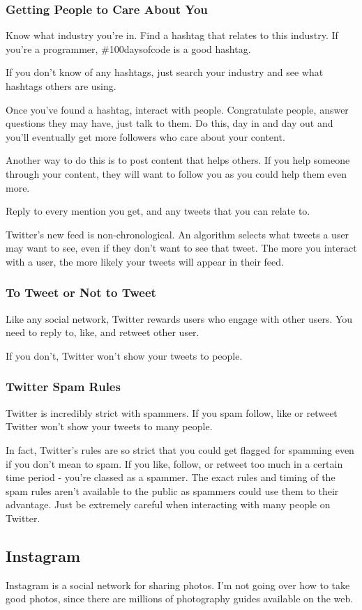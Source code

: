 \documentclass{article}
\begin{document}
\subsubsection{Getting People to Care About You}
Know what industry you're in. Find a hashtag that relates to this
industry. If you're a programmer, \#100daysofcode is a good hashtag.

If you don't know of any hashtags, just search your industry and see
what hashtags others are using.

Once you've found a hashtag, interact with people. Congratulate people,
answer questions they may have, just talk to them. Do this, day in and
day out and you'll eventually get more followers who care about your
content.

Another way to do this is to post content that helps others. If you help
someone through your content, they will want to follow you as you could
help them even more.

Reply to every mention you get, and any tweets that you can relate to.

Twitter's new feed is non-chronological. An algorithm selects what
tweets a user may want to see, even if they don't want to see that
tweet. The more you interact with a user, the more likely your tweets
will appear in their feed.
\subsubsection{To Tweet or Not to Tweet}
Like any social network, Twitter rewards users who engage with other
users. You need to reply to, like, and retweet other user.

If you don't, Twitter won't show your tweets to people.
\subsubsection{Twitter Spam Rules}
Twitter is incredibly strict with spammers. If you spam follow, like or
retweet Twitter won't show your tweets to many people.

In fact, Twitter's rules are so strict that you could get flagged for
spamming even if you don't mean to spam. If you like, follow, or retweet
too much in a certain time period - you're classed as a spammer. The
exact rules and timing of the spam rules aren't available to the public
as spammers could use them to their advantage. Just be extremely careful
when interacting with many people on Twitter.
\subsection{Instagram}
Instagram is a social network for sharing photos. I'm not going over how
to take good photos, since there are millions of photography guides
available on the web.
\end{document}
